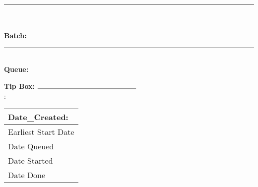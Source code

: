 \documentclass[11pt,a4paper]{memoir}
\begin{document}
	\noindent
	\rule{\textwidth}{.3mm}\\

    \noindent\textbf{\Huge{}}\\
    \Large{ \hfill \textbf{Batch: }}\\
    \rule{\textwidth}{.3mm}\\
    \normalsize{\textbf{Queue:} }
	\vspace{3mm}

	\begin{minipage}[t]{\textwidth}
	    \begin{minipage}[t][4cm]{0.4\textwidth}
		    \strut\vspace*{-\baselineskip}\newline
			\textbf{Tip Box:} $\rule{5cm}{0.15mm}$ \\

				\textbf{}:  \\
	    \end{minipage}
	    \begin{minipage}[t]{0.15\textwidth}
	    		\small
		    \strut\vspace*{-\baselineskip}\newline
	    		\begin{tabular}{|p{\textwidth}|}
	    		 \hline
	    		 Date\_Created: \textbf{\VAR{Date}}\\
				 \hline
	    		 {\color{lightgray}Earliest Start Date}\\
	    		 \hline    		 
	    		 {\color{lightgray}Date Queued}\\
	    		 \hline
	    		 {\color{lightgray}Date Started}\\
	    		 \hline
	    		 {\color{lightgray}Date Done}\\
	    		 \hline
	    		\end{tabular}\\
	    \end{minipage}
	    	\vspace{1mm} \\
    \end{minipage}
\end{document}
